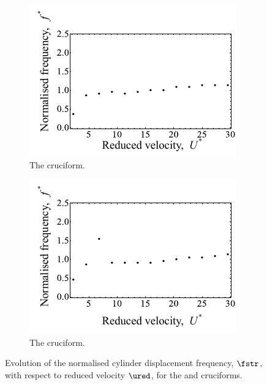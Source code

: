\documentclass[a4paper,fleqn]{cas-sc}
\begin{document}
\begin{figure}
  \centering
  \begin{subfigure}[h]{0.4\textwidth}
    \includegraphics[width=\textwidth]{figs/yStrFreq2}
    \caption{The \angtw{} cruciform.}
    \label{fig:yStrFreq2}
  \end{subfigure}
  \hspace{6mm}
  \begin{subfigure}[h]{0.4\textwidth}
    \includegraphics[width=\textwidth]{figs/yStrFreq1}
    \caption{The \angon{} cruciform.}
    \label{fig:yStrFreq1}
  \end{subfigure}

  \caption{Evolution of the normalised cylinder displacement frequency, $\fstr$, with respect to reduced velocity $\ured$, for the \angtw{} and \angon{} cruciforms.}
  \label{fig:yStrFreq21}
\end{figure}
\end{document}
